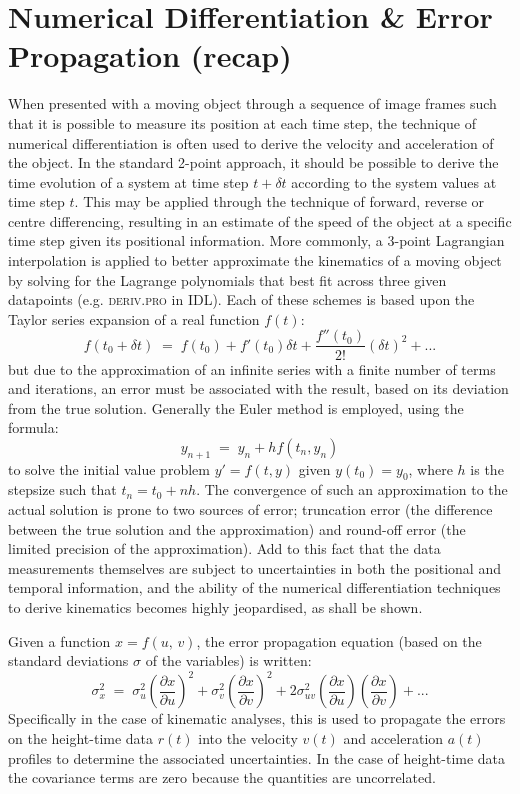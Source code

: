 \documentclass[structabstract]{aa}
\begin{document}
\section{Numerical Differentiation \& Error Propagation (recap)}
When presented with a moving object through a sequence of image frames such that it is possible to measure its position at each time step, the technique of numerical differentiation is often used to derive the velocity and acceleration of the object. In the standard 2-point approach, it should be possible to derive the time evolution of a system at time step $t+\delta t$ according to the system values at time step $t$. This may be applied through the technique of forward, reverse or centre differencing, resulting in an estimate of the speed of the object at a specific time step given its positional information. More commonly, a 3-point Lagrangian interpolation is applied to better approximate the kinematics of a moving object by solving for the Lagrange polynomials that best fit across three given datapoints (e.g. \textsc{deriv.pro} in IDL). Each of these schemes is based upon the Taylor series expansion of a real function $f(t)$:
\begin{equation}
\label{taylor1}
f(t_0+\delta t) \; = \; f(t_0)+f'(t_0)\delta t +  \frac{f''(t_0)}{2!}(\delta t)^{2}  + ...
\end{equation}
but due to the approximation of an infinite series with a finite number of terms and iterations, an error must be associated with the result, based on its deviation from the true solution. Generally the Euler method is employed, using the formula:
\begin{equation}
y_{n+1} \; = \; y_n + h f(t_n, y_n)
\end{equation}
to solve the initial value problem $y'=f(t,y)$ given $y(t_0)=y_0$, where $h$ is the stepsize such that $t_n=t_0+nh$. The convergence of such an approximation to the actual solution is prone to two sources of error; truncation error (the difference between the true solution and the approximation) and round-off error (the limited precision of the approximation). Add to this fact that the data measurements themselves are subject to uncertainties in both the positional and temporal information, and the ability of the numerical differentiation techniques to derive kinematics becomes highly jeopardised, as shall be shown.

Given a function $x=f(u,\,v)$, the error propagation equation (based on the standard deviations $\sigma$ of the variables) is written:
\begin{equation}
\label{eqn_errorprop}
\sigma_x^2 \; = \; \sigma_u^2 \left(\frac{\partial x}{\partial u}\right) ^2 + \sigma_v^2 \left( \frac{\partial x}{\partial v} \right) ^2 + 2 \sigma_{uv}^2 \left( \frac{\partial x}{\partial u} \right) \left( \frac{\partial x}{\partial v} \right) + ...
\end{equation}
Specifically in the case of kinematic analyses, this is used to propagate the errors on the height-time data $r(t)$ into the velocity $v(t)$ and acceleration $a(t)$ profiles to determine the associated uncertainties. In the case of height-time data the covariance terms are zero because the quantities are uncorrelated.
\end{document}
